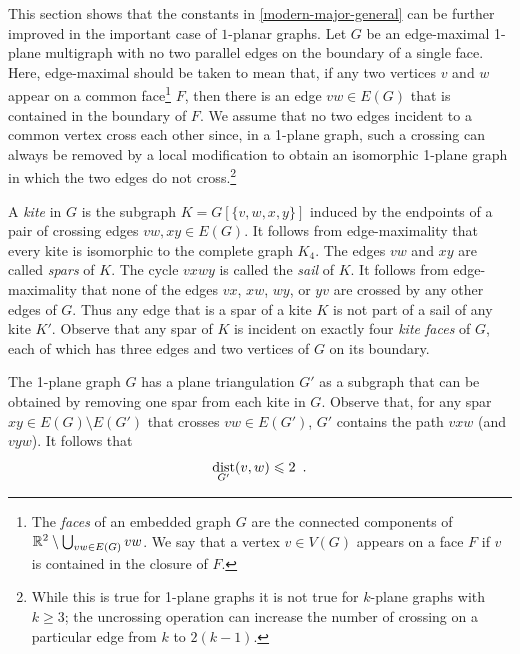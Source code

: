 \documentclass{patmorin}
\DeclareMathOperator{\dist}{dist}
\renewcommand{\ge}{\geqslant}
\renewcommand{\le}{\leqslant}
\begin{document}
This section shows that the constants in \cref{modern-major-general} can be further improved in the important case of $1$-planar graphs. Let $G$ be an edge-maximal 1-plane multigraph with no two parallel edges on the boundary of a single face.  Here, edge-maximal should be taken to mean that, if any two vertices $v$ and $w$ appear on a common face\footnote{The \emph{faces} of an embedded graph $G$ are the connected components of $\mathbb{R}^2\setminus \bigcup_{vw\in E(G)} vw$.  We say that a vertex $v\in V(G)$ appears on a face $F$ if $v$ is contained in the closure of $F$.} $F$, then there is an edge $vw\in E(G)$ that is contained in the boundary of $F$.  We assume that no two edges incident to a common vertex cross each other since, in a 1-plane graph, such a crossing can always be removed by a local modification to obtain an isomorphic 1-plane graph in which the two edges do not cross.\footnote{While this is true for 1-plane graphs it is not true for $k$-plane graphs with $k\ge 3$; the uncrossing operation can increase the number of crossing on a particular edge from $k$ to $2(k-1)$.}

A \emph{kite} in $G$ is the subgraph $K=G[\{v,w,x,y\}]$ induced by the endpoints of a pair of crossing edges $vw,xy\in E(G)$.  It follows from edge-maximality that every kite is isomorphic to the complete graph $K_4$.
The edges $vw$ and $xy$ are called \emph{spars} of $K$.  The cycle $vxwy$ is called the \emph{sail} of $K$.  It follows from edge-maximality that none of the edges $vx$, $xw$, $wy$, or $yv$ are crossed by any other edges of $G$. Thus any edge that is a spar of a kite $K$ is not part of a sail of any kite $K'$. Observe that any spar of $K$ is incident on exactly four \emph{kite faces} of $G$, each of which has three edges and two vertices of $G$ on its boundary.

The 1-plane graph $G$ has a plane triangulation $G'$ as a subgraph that can be obtained by removing one spar from each kite in $G$.  Observe that, for any spar $xy\in E(G)\setminus E(G')$ that crosses $vw\in E(G')$, $G'$ contains the path $vxw$ (and $vyw$).  It follows that 
\begin{equation}
  \dist_{G'}(v,w)\le 2 \enspace . \eqlabel{spar-distance}
\end{equation}
\end{document}

